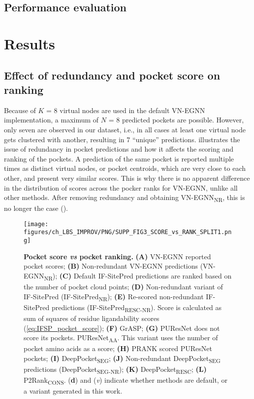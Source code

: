 \subsection{Performance evaluation}

\FloatBarrier

\section{Results}

\subsection{Effect of redundancy and pocket score on ranking}

Because of $K$ = 8 virtual nodes are used in the default VN-EGNN implementation, a maximum of $N$ = 8 predicted pockets are possible. However, only seven are observed in our dataset, i.e., in all cases at least one virtual node gets clustered with another, resulting in 7 ``unique'' predictions.  illustrates the issue of redundancy in pocket predictions and how it affects the scoring and ranking of the pockets. A prediction of the same pocket is reported multiple times as distinct virtual nodes, or pocket centroids, which are very close to each other, and present very similar scores. This is why there is no apparent difference in the distribution of scores across the pocker ranks for VN-EGNN, unlike all other methods. After removing redundancy and obtaining VN-EGNN\textsubscript{NR}, this is no longer the case ().

\begin{figure}[htb!]
    \centering
    \texttt{[image: figures/ch\_LBS\_IMPROV/PNG/SUPP\_FIG3\_SCORE\_vs\_RANK\_SPLIT1.png]}
    \caption[Pocket score \textit{vs} pocket ranking]{\textbf{Pocket score \textit{vs} pocket ranking.} \textbf{(A)} VN-EGNN reported pocket scores; \textbf{(B)} Non-redundant VN-EGNN predictions (VN-EGNN\textsubscript{NR}); \textbf{(C)} Default IF-SitePred predictions are ranked based on the number of pocket cloud points; \textbf{(D)} Non-redundant variant of IF-SitePred (IF-SitePred\textsubscript{NR}); \textbf{(E)} Re-scored non-redundant IF-SitePred predictions (IF-SitePred\textsubscript{RESC-NR}). Score is calculated as sum of squares of residue ligandability scores (\autoref{eq:IFSP_pocket_score}); \textbf{(F)} GrASP; \textbf{(G)} PUResNet does not score its pockets. PUResNet\textsubscript{AA}. This variant uses the number of pocket amino acids as a score; \textbf{(H)} PRANK scored PUResNet pockets; \textbf{(I)} DeepPocket\textsubscript{SEG}; \textbf{(J)} Non-redundant DeepPocket\textsubscript{SEG} predictions (DeepPocket\textsubscript{SEG-NR}); \textbf{(K)} DeepPocket\textsubscript{RESC}; \textbf{(L)} P2Rank\textsubscript{CONS}. (\textbf{d}) and (\textit{v}) indicate whether methods are default, or a variant generated in this work.}
    \label{fig:pocket_score_vs_rank1}
\end{figure}

